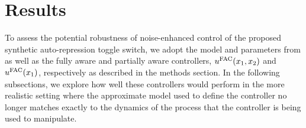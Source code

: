 \documentclass[12pt]{article}
\begin{document}

\section{Results}

To assess the potential robustness of noise-enhanced control of the proposed synthetic auto-repression toggle switch, we adopt the model and  parameters from \cite{May2021} as well as the fully aware and partially aware controllers, $u^{\rm FAC}(x_1,x_2)$ and  $u^{\rm FAC}(x_1)$, respectively as described in the methods section.  In the following subsections, we explore how well these controllers would perform in the more realistic setting where the approximate model used to define the controller no longer matches exactly to the dynamics of the process that the controller is being used to manipulate. 
\end{document}
